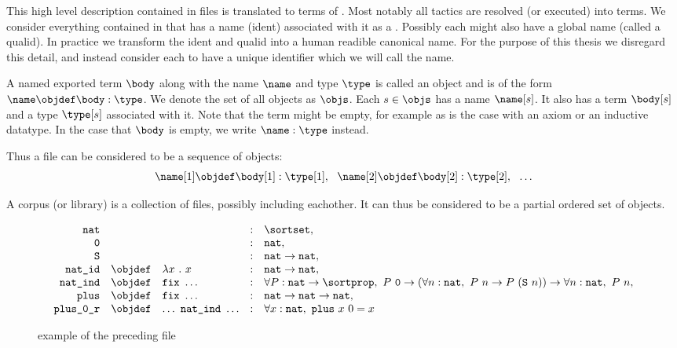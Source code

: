 This high level description contained in \coq files is translated to terms of \pcic.
Most notably all tactics are resolved (or executed) into terms.
We consider everything contained in \pcic that has a name (ident) associated with it as a \coqobj.
Possibly each \coqobj might also have a global name (called a qualid).
In practice we transform the ident and qualid into a human readible canonical name.
For the purpose of this thesis we disregard this detail, and instead consider each \coqobj to have a unique identifier which we will call the name.

\begin{definition}[{\coqobj[s]}]
	A named exported \coq term $\body$ along with the name $\name$ and type $\type$ is called an \coq object and is of the form $\name \objdef \body : \type$.
	We denote the set of all \coq objects as $\objs$.
	Each \coqobj $s \in \objs$ has a name $\name[s]$.
	It also has a term $\body[s]$ and a type $\type[s]$ associated with it.
	Note that the term might be empty, for example as is the case with an axiom or an inductive datatype.
	In the case that $\body$ is empty, we write $\name : \type$ instead.
\end{definition}


Thus a \coq file can be considered to be a sequence of \coq objects:
$$ \name[1] \objdef \body[1] : \type[1], ~~ \name[2] \objdef \body[2] : \type[2], ~~ \ldots $$

A \coq corpus (or library) is a collection of \coq files, possibly including eachother.
It can thus be considered to be a partial ordered set of \coq objects.

\begin{figure}[H]
	$$
		\begin{array}{rclcl}
			\texttt{nat} & & & : & \sortset, \\
			\texttt{0} & & & : & \texttt{nat}, \\
			\texttt{S} & & & : & \texttt{nat} \rightarrow \texttt{nat}, \\
			\texttt{nat\_id} & \objdef & \lambda x~.~x & : & \texttt{nat} \rightarrow \texttt{nat}, \\
			\texttt{nat\_ind} & \objdef & \texttt{fix}~\ldots & : &
				\forall P : \texttt{nat} \rightarrow \sortprop,~
				P~\texttt{0} \rightarrow (\forall n : \texttt{nat},~ P~n \rightarrow P~(\texttt{S}~n)) \rightarrow \forall n : \texttt{nat},~ P~n, \\
			\texttt{plus} & \objdef & \texttt{fix}~\ldots & : & \texttt{nat} \rightarrow \texttt{nat} \rightarrow \texttt{nat}, \\
			\texttt{plus\_0\_r} & \objdef & \ldots~\texttt{nat\_ind}~\ldots & : & \forall x : \texttt{nat},~ \texttt{plus}~x~0 = x
		\end{array}
	$$
	\caption{\coqobj example of the preceding \coq file}
\end{figure}

